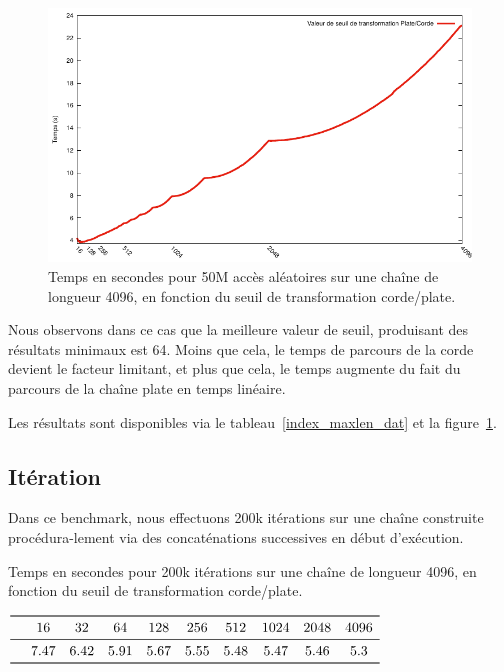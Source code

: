 \begin{figure}
	\caption{Temps en secondes pour 50M accès aléatoires sur une chaîne de longueur 4096, en fonction du seuil de transformation corde/plate.}
	\label{index_maxlen_fig}
	\centering
	\includegraphics[]{figures/index_maxlen.pdf}
\end{figure}

Nous observons dans ce cas que la meilleure valeur de seuil, produisant des résultats minimaux est 64.
Moins que cela, le temps de parcours de la corde devient le facteur limitant, et plus que cela, le temps augmente du
fait du parcours de la chaîne plate en temps linéaire.

Les résultats sont disponibles via le tableau~\ref{index_maxlen_dat} et la figure~\ref{index_maxlen_fig}.

\subsection{Itération}

Dans ce benchmark, nous effectuons 200k itérations sur une chaîne construite procédura-lement via
des concaténations successives en début d'exécution.

\begin{table}
	\caption{\label{iter_maxlen_dat}Temps en secondes pour 200k itérations sur une chaîne de longueur 4096, en fonction du seuil de transformation corde/plate.}
	\centering
	$\begin{array}{ *{10}{c} }
		\toprule
		& 16 & 32 & 64 & 128 & 256 & 512 & 1024 & 2048 & 4096 \\
		\midrule
		& 7.47 & 6.42 & 5.91 & 5.67 & 5.55 & 5.48 & 5.47 & 5.46 & 5.3\\
		\bottomrule
	\end{array}$
\end{table}

